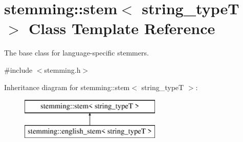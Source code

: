 \section{stemming\+:\+:stem$<$ string\+\_\+typeT $>$ Class Template Reference}
\label{classstemming_1_1stem}


The base class for language-\/specific stemmers.  




{\ttfamily \#include $<$stemming.\+h$>$}

Inheritance diagram for stemming\+:\+:stem$<$ string\+\_\+typeT $>$\+:\begin{figure}[H]
\begin{center}
\leavevmode
\includegraphics[height=2.000000cm]{classstemming_1_1stem}
\end{center}
\end{figure}
